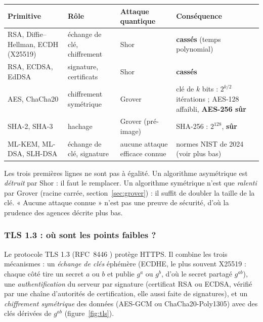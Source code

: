\begin{center}
\renewcommand{\arraystretch}{1.25}
\begin{tabular}{@{}>{\raggedright\arraybackslash}p{4.1cm}>{\raggedright\arraybackslash}p{2.9cm}>{\raggedright\arraybackslash}p{2.5cm}>{\raggedright\arraybackslash}p{5.2cm}@{}}
\toprule
\textbf{Primitive} & \textbf{Rôle} & \textbf{Attaque quantique} & \textbf{Conséquence}\\
\midrule
RSA, Diffie--Hellman, ECDH (X25519) & échange de clé, chiffrement & Shor & \textbf{cassés} (temps polynomial)\\
RSA, ECDSA, EdDSA & signature, certificats & Shor & \textbf{cassés}\\
AES, ChaCha20 & chiffrement symétrique & Grover & clé de $k$ bits : $2^{k/2}$ itérations ; AES-128 affaibli, \textbf{AES-256 sûr}\\
SHA-2, SHA-3 & hachage & Grover (pré-image) & SHA-256 : $2^{128}$, \textbf{sûr}\\
ML-KEM, ML-DSA, SLH-DSA & échange de clé, signature & aucune attaque efficace connue & normes NIST de 2024 (voir plus bas)\\
\bottomrule
\end{tabular}
\end{center}

Les trois premières lignes ne sont pas à égalité. Un algorithme asymétrique est \emph{détruit} par Shor : il faut
le remplacer. Un algorithme symétrique n'est que \emph{ralenti} par Grover (racine carrée, section~\ref{sec:grover}) :
il suffit de doubler la taille de la clé. « Aucune attaque connue » n'est pas une preuve de sécurité, d'où la prudence
des agences décrite plus bas.

\subsubsection{TLS 1.3 : où sont les points faibles ?}

Le protocole TLS 1.3 (RFC~8446 \parencite{rfc8446}) protège HTTPS. Il combine les trois mécanismes : un
\emph{échange de clés} éphémère (ECDHE, le plus souvent X25519 : chaque côté tire un secret $a$ ou $b$ et
publie $g^a$ ou $g^b$, d'où le secret partagé $g^{ab}$), une \emph{authentification} du serveur par signature
(certificat RSA ou ECDSA, vérifié par une chaîne d'autorités de certification, elle aussi faite de signatures),
et un \emph{chiffrement symétrique} des données (AES-GCM ou ChaCha20-Poly1305) avec des clés dérivées de $g^{ab}$
(figure~\ref{fig:tls}).

